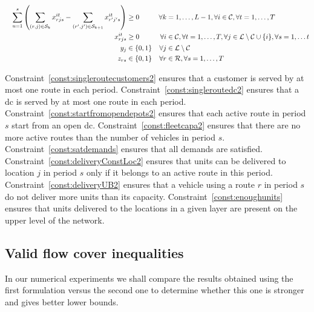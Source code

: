 \begin{alignat}{3}
    &&\sum_{u=1}^s \left(\sum_{(r,j)\in\mathcal{S}_k} x^{it}_{rjs} - \sum_{(r',j')\in\mathcal{S}_{k+1}} x^{it}_{r'j's}\right) &\geq 0\quad 			&\forall k&=1,\ldots,L-1, \forall i\in\mathcal{C}, \forall t=1,\ldots,T \label{const:enoughunits}\\
    &&x^{it}_{rjs}			&\geq 0 															&\forall i&\in \mathcal{C},\forall t=1,\ldots, T, \forall j\in \mathcal{L}\setminus\mathcal{C}\cup\{i\}, \forall s= 1,\ldots t\label{const:upos2}	\\
    &&y_{j}					& \in \{0,1\} 														&\forall j&\in \mathcal{L}\setminus\mathcal{C}\label{const:ybool2}\\	
    &&z_{rs}					&\in \{0,1\} 														&\forall r&\in \mathcal{R}, \forall s=1,\ldots,T\label{const:zbool2}
\end{alignat}

Constraint~\eqref{const:singleroutecustomers2} ensures that a customer is served by at most one route in each period.
Constraint~\eqref{const:singleroutedc2} ensures that a dc is served by at most one route in each period.
Constraint~\eqref{const:startfromopendepots2} ensures that each active route in period $s$ start from an open dc.
Constraint~\eqref{const:fleetcapa2} ensures that there are no more active routes than the number of vehicles in period $s$.
Constraint~\eqref{const:satdemands} ensures that all demands are satisfied.
Constraint~\eqref{const:deliveryConstLoc2} ensures that units can be delivered to location $j$ in period $s$ only if it belongs to an active route in this period.
Constraint~\eqref{const:deliveryUB2} ensures that a vehicle using a route $r$ in period $s$ do not deliver more units than its capacity.
Constraint~\eqref{const:enoughunits} ensures that units delivered to the locations in a given layer are present on the upper level of the network.

\subsection{Valid flow cover inequalities}
In our numerical experiments we shall compare the results obtained using the first formulation versus the second one to determine whether this one is stronger and gives better lower bounds.

